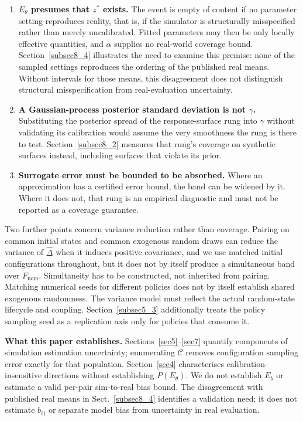 \documentclass[pdflatex,iicol,sn-apa]{sn-jnl}
\theoremstyle{remark}
\begin{document}
\begin{appendices}
\begin{enumerate}
\item \textbf{$E_\theta$ presumes that $z^*$ exists.} The event is empty of content if no
parameter setting reproduces reality, that is, if the simulator is structurally misspecified
rather than merely uncalibrated. Fitted parameters may then be only locally effective quantities,
and $\alpha$ supplies no real-world coverage bound. Section~\ref{subsec8_4} illustrates the need
to examine this premise: none of the sampled settings reproduces the ordering of the published
real means. Without intervals for those means, this disagreement does not distinguish structural
misspecification from real-evaluation uncertainty.

\item \textbf{A Gaussian-process posterior standard deviation is not $\gamma$.} Substituting the
posterior spread of the response-surface rung into $\gamma$ without validating its calibration
would assume the very smoothness the rung is there to test. Section~\ref{subsec8_2} measures that
rung's coverage on synthetic surfaces instead, including surfaces that violate its prior.

\item \textbf{Surrogate error must be bounded to be absorbed.} Where an approximation has a
certified error bound, the band can be widened by it. Where it does not, that rung is an empirical
diagnostic and must not be reported as a coverage guarantee.
\end{enumerate}

Two further points concern variance reduction rather than coverage. Pairing on common initial states
and common exogenous random draws can reduce the variance of $\hat\Delta$ when it induces
positive covariance, and we use matched initial configurations throughout,
but it does not by itself produce a simultaneous band over $F_{\mathrm{nom}}$. Simultaneity has to be
constructed, not inherited from pairing. Matching numerical seeds for different policies does
not by itself establish shared exogenous randomness. The variance model must reflect the actual
random-state lifecycle and coupling. Section~\ref{subsec5_3} additionally treats the policy
sampling seed as a replication axis only for policies that consume it.

\textbf{What this paper establishes.} Sections~\ref{sec5}--\ref{sec7} quantify components of
simulation estimation uncertainty; enumerating $\mathcal{C}$ removes configuration sampling
error exactly for that population. Section~\ref{sec4} characterises calibration-insensitive
directions without establishing $P(E_\theta)$. We do not establish $E_b$ or estimate a
valid per-pair sim-to-real bias bound. The disagreement with published real means in
Sect.~\ref{subsec8_4} identifies a validation need; it does not estimate $b_{ij}$ or separate model
bias from uncertainty in real evaluation.


\end{appendices}
\end{document}
